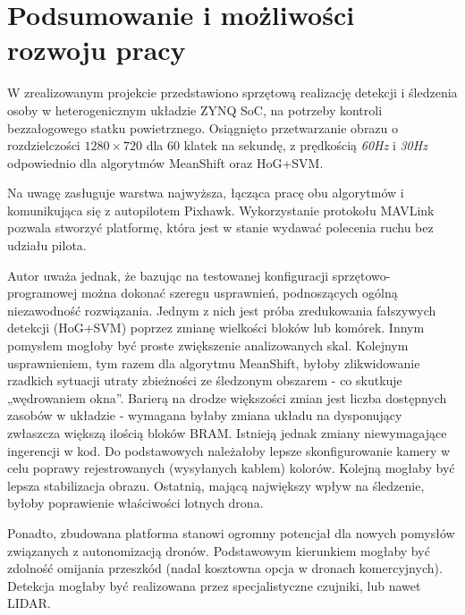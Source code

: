 \chapter{Podsumowanie i możliwości rozwoju pracy}

W zrealizowanym projekcie przedstawiono sprzętową realizację detekcji i śledzenia osoby w heterogenicznym układzie ZYNQ SoC, na potrzeby kontroli bezzałogowego statku powietrznego. Osiągnięto przetwarzanie obrazu o rozdzielczości $1280\times 720$ dla 60 klatek na sekundę, z prędkością \textit{60Hz} i \textit{30Hz} odpowiednio dla algorytmów MeanShift oraz HoG+SVM.

Na uwagę zasługuje warstwa najwyższa, łącząca pracę obu algorytmów i komunikująca się z autopilotem Pixhawk. Wykorzystanie protokołu MAVLink pozwala stworzyć platformę, która jest w stanie wydawać polecenia ruchu bez udziału pilota.

Autor uważa jednak, że bazując na testowanej konfiguracji sprzętowo-programowej można dokonać szeregu usprawnień, podnoszących ogólną niezawodność rozwiązania. Jednym z nich jest próba zredukowania fałszywych detekcji (HoG+SVM) poprzez zmianę wielkości bloków lub komórek. Innym pomysłem mogłoby być proste zwiększenie analizowanych skal. Kolejnym usprawnieniem, tym razem dla algorytmu MeanShift, byłoby zlikwidowanie rzadkich sytuacji utraty zbieżności ze śledzonym obszarem - co skutkuje „wędrowaniem okna”. Barierą na drodze większości zmian jest liczba dostępnych zasobów w układzie - wymagana byłaby zmiana układu na dysponujący zwłaszcza większą ilością bloków BRAM. Istnieją jednak zmiany niewymagające ingerencji w kod. Do podstawowych należałoby lepsze skonfigurowanie kamery w celu poprawy rejestrowanych (wysyłanych kablem) kolorów. Kolejną mogłaby być lepsza stabilizacja obrazu. Ostatnią, mającą największy wpływ na śledzenie, byłoby poprawienie właściwości lotnych drona.

Ponadto, zbudowana platforma stanowi ogromny potencjał dla nowych pomysłów związanych z autonomizacją dronów. Podstawowym kierunkiem mogłaby być zdolność omijania przeszkód (nadal kosztowna opcja w dronach komercyjnych). Detekcja mogłaby być realizowana przez specjalistyczne czujniki, lub nawet LIDAR.\newline 



